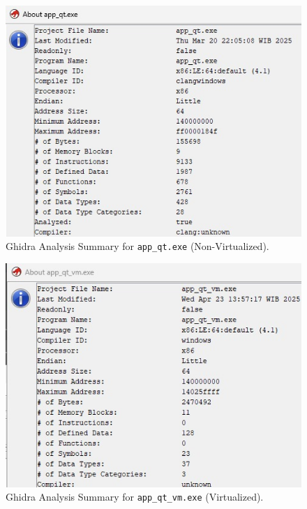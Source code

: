 \begin{figure}[!t] %
    \centering
    \includegraphics[width=0.9\linewidth]{../assets/pics/app_qt_summary_result.jpeg} %
    \caption{Ghidra Analysis Summary for \texttt{app\_qt.exe} (Non-Virtualized).}
    \label{fig:ghidra_summary_qt} %
\end{figure}

\begin{figure}[!t]
    \centering
    \includegraphics[width=0.9\linewidth]{../assets/pics/app_qt_vm_summary_result.jpeg} %
    \caption{Ghidra Analysis Summary for \texttt{app\_qt\_vm.exe} (Virtualized).}
    \label{fig:ghidra_summary_qt_vm} %
\end{figure}


